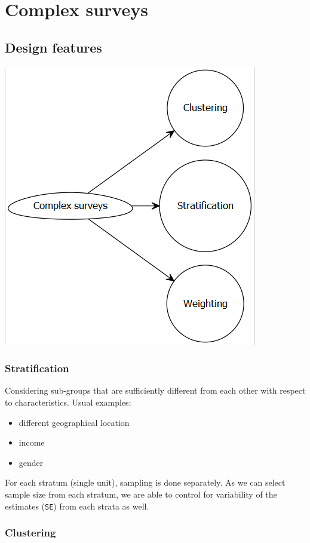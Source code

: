 \documentclass[
]{book}
\providecommand{\tightlist}{%
  \setlength{\itemsep}{0pt}\setlength{\parskip}{0pt}}
\begin{document}
\hypertarget{complex-surveys}{%
\section{Complex surveys}\label{complex-surveys}}

\hypertarget{design-features}{%
\subsection{Design features}\label{design-features}}

\includegraphics[width=0.45\linewidth]{images/design2}

\hypertarget{stratification}{%
\subsubsection{Stratification}\label{stratification}}

Considering sub-groups that are sufficiently different from each other with respect to characteristics. Usual examples:

\begin{itemize}
\tightlist
\item
  different geographical location
\item
  income
\item
  gender
\end{itemize}

For each stratum (single unit), sampling is done separately. As we can select sample size from each stratum, we are able to control for variability of the estimates (\texttt{SE}) from each strata as well.

\hypertarget{clustering}{%
\subsubsection{Clustering}\label{clustering}}
\end{document}

